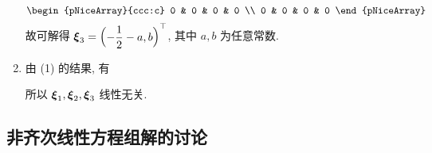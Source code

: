 \begin{solution}
\begin{enumerate}[label=(\arabic{*})]
$$\begin{pNiceArray}{ccc:c}
                      0 & 0 & 0 & 0             \\
                      0 & 0 & 0 & 0
                  \end{pNiceArray}$$
              故可解得 $\vb*{\xi}_3=\mqty(-\dfrac{1}{2}-a,b)^\top$, 其中 $a,b$ 为任意常数.
        \item 由 (1) 的结果, 有
              所以 $\vb*{\xi}_1,\vb*{\xi}_2,\vb*{\xi}_3$ 线性无关.
    \end{enumerate}
\end{solution}

\subsection{非齐次线性方程组解的讨论}

